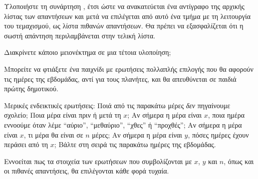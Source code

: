 \documentclass[a4paper,11pt,oneside]{book}
\begin{document}
\begin{exercise}
Υλοποιήστε τη συνάρτηση , έτσι ώστε να ανακατεύεται ένα αντίγραφο της αρχικής λίστας των απαντήσεων και μετά να επιλέγεται από αυτό ένα τμήμα με τη λειτουργία του τεμαχισμού, ως λίστα πιθανών απαντήσεων. Θα πρέπει να εξασφαλίζεται ότι η σωστή απάντηση περιλαμβάνεται στην τελική λίστα.

Διακρίνετε κάποιο μειονέκτημα σε μια τέτοια υλοποίηση;
\end{exercise}


\begin{exercise}
Μπορείτε να φτιάξετε ένα παιχνίδι με ερωτήσεις πολλαπλής επιλογής που θα αφορούν τις ημέρες της εβδομάδας, αντί για τους πλανήτες, και θα απευθύνεται σε παιδιά πρώτης δημοτικού.

\begin{note}
Mερικές ενδεικτικές ερωτήσεις: Ποιά από τις παρακάτω μέρες \emph{δεν} πηγαίνουμε σχολείο; Ποια μέρα είναι πριν ή μετά τη $x$; Αν σήμερα η μέρα είναι $x$, ποια ημέρα εννοούμε όταν λέμε ``αύριο'', ``μεθαύριο'', ``χθες'' ή ``προχθές''; Αν σήμερα η μέρα είναι $x$, τι μέρα θα είναι σε $n$ μέρες; Αν σήμερα η μέρα είναι $y$, πόσες ημέρες έχουν περάσει από τη $x$; Βάλτε στη σειρά τις παρακάτω ημέρες της εβδομάδας.
\end{note}

Εννοείται πως τα στοιχεία των ερωτήσεων που συμβολίζονται με $x$, $y$ και $n$, όπως και οι πιθανές απαντήσεις, θα επιλέγονται κάθε φορά τυχαία.
\end{exercise}
\end{document}
